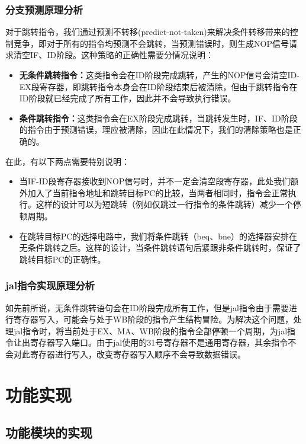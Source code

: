 \documentclass[UTF8]{ctexart}
\begin{document}
\subsubsection{分支预测原理分析}\label{sec:design-branch-predict}
    对于跳转指令，我们通过预测不转移(predict-not-taken)来解决条件转移带来的控制竞争，即对于所有的指令均预测不会跳转，当预测错误时，则生成NOP信号请求清空IF、ID阶段。这种策略的正确性需要分情况说明：
    \begin{itemize}
        \item \textbf{无条件跳转指令：}这类指令会在ID阶段完成跳转，产生的NOP信号会清空ID-EX段寄存器，即跳转指令本身会在ID阶段结束后被清除，但由于跳转指令在ID阶段就已经完成了所有工作，因此并不会导致执行错误。
        \item \textbf{条件跳转指令：}这类指令会在EX阶段完成跳转，当跳转发生时，IF、ID阶段的指令由于预测错误，理应被清除，因此在此情况下，我们的清除策略也是正确的。
    \end{itemize}
    在此，有以下两点需要特别说明：
    \begin{itemize}
        \item 当IF-ID段寄存器接收到NOP信号时，并不一定会清空段寄存器，此处我们额外加入了当前指令地址和跳转目标PC的比较，当两者相同时，指令会正常执行。这样的设计可以为短跳转（例如仅跳过一行指令的条件跳转）减少一个停顿周期。
        \item 在跳转目标PC的选择电路中，我们将条件跳转（beq、bne）的选择器安排在无条件跳转之后。这样的设计，当条件跳转语句后紧跟非条件跳转时，保证了跳转目标PC的正确性。
    \end{itemize}
\subsubsection{jal指令实现原理分析}
    如先前所说，无条件跳转语句会在ID阶段完成所有工作，但是jal指令由于需要进行寄存器写入，可能会与处于WB阶段的指令产生结构冒险。为解决这个问题，处理jal指令时，将当前处于EX、MA、WB阶段的指令全部停顿一个周期，为jal指令让出寄存器写入端口。由于jal使用的31号寄存器不是通用寄存器，其余指令不会对此寄存器进行写入，改变寄存器写入顺序不会导致数据错误。

\section{功能实现}\label{sec-imp}

\subsection{功能模块的实现}
\end{document}
